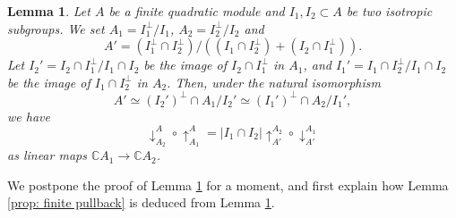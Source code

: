 \documentclass[12pt]{amsart}
\numberwithin{equation}{section}
\newtheorem{lemma}[theorem]{Lemma}
\theoremstyle{definition}
\theoremstyle{remark}
\newcommand{\C}{\mathbb{C}}
\begin{document}
\begin{lemma}\label{lem: finite pullback FQM}
Let $A$ be a finite quadratic module and 
$I_1, I_2 \subset A$ be two isotropic subgroups. %
We set $A_1=I_1^{\perp}/I_1$, $A_2=I_2^{\perp}/I_2$ and 
\begin{equation*}
A'= %
(I_{1}^{\perp}\cap I_{2}^{\perp}) / ((I_{1}\cap I_{2}^{\perp})+(I_{2}\cap I_{1}^{\perp})). 
\end{equation*}
Let $I_{2}'=I_{2}\cap I_{1}^{\perp}/I_{1}\cap I_{2}$ be the image of $I_{2}\cap I_{1}^{\perp}$ in $A_{1}$, 
and $I_{1}'=I_{1}\cap I_{2}^{\perp}/I_{1}\cap I_{2}$ be the image of $I_{1}\cap I_{2}^{\perp}$ in $A_{2}$. 
Then, under the natural isomorphism 
\begin{equation}\label{eqn: description of A'}
A' \simeq (I_{2}')^{\perp}\cap A_{1}/I_{2}' \simeq (I_{1}')^{\perp}\cap A_{2}/I_{1}', 
\end{equation}
we have 
\begin{equation}\label{eqn: pull push commute FQM}
\downarrow^{A}_{A_{2}} \circ \uparrow^{A}_{A_{1}} = 
| I_{1} \cap I_{2} |  \uparrow^{A_{2}}_{A'} \circ \downarrow^{A_{1}}_{A'} 
\end{equation}
as linear maps 
${\C}A_{1} \to {\C}A_{2}$. 
\end{lemma}

We postpone the proof of Lemma \ref{lem: finite pullback FQM} for a moment, 
and first explain how Lemma \ref{prop: finite pullback} is deduced from Lemma \ref{lem: finite pullback FQM}. 
\end{document}
